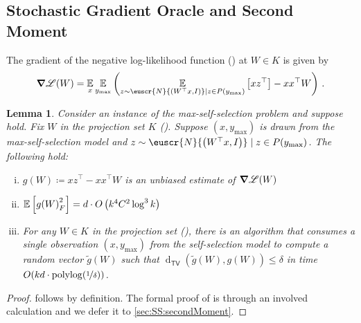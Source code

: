 \documentclass[11pt,letterpaper]{article}
\theoremstyle{plain}
\newtheorem{lemma}[theorem]{Lemma}
\theoremstyle{definition}
\theoremstyle{remark}
\newcommand{\inparen}[1]{\ensuremath{\left(#1\right)}}
\newcommand{\insquare}[1]{\ensuremath{\left[#1\right]}}
\let\norm\relax
\newcommand{\norm}[1]{\ensuremath{\left\lVert #1 \right\rVert}}
\newcommand{\E}{\operatornamewithlimits{\mathbb{E}}}
\newcommand{\Ex}{\E}
\newcommand{\tv}[2]{\operatorname{d}_{\mathsf{TV}}{\inparen{#1,#2}}}
\newcommand{\nfrac}[2]{\nicefrac{#1}{#2}}
\newcommand{\polylog}{\mathrm{polylog}}
\renewcommand{\tilde}{\widetilde}
\newcommand{\customcal}[1]{\euscr{#1}}
\newcommand{\cL}{\customcal{L}}
\newcommand{\cN}{\customcal{N}}
\newcommand{\negLL}{\ensuremath{\mathscr{L}}}
\newcommand{\normal}[2]{\cN{\inparen{#1,#2}}}
\newcommand{\ymax}{y_{\max}}
\renewcommand{\cL}{\negLL}
\begin{document}
{{\subsection{Stochastic Gradient Oracle and Second Moment}
    The gradient of the negative log-likelihood function () at $W\in K$ is given by
    \begin{align*}
        \grad \cL(W)
            = \Ex_x \Ex_{\ymax}
                \inparen{
                    \Ex_{z\sim \normal{W^\top x}{I} \mid z\in P(\ymax)}\insquare{xz^\top }
                    - 
                    xx^\top W
                }
            \,.
    \end{align*}
    
    \begin{lemma}\label{lem:SS:gradientOracle}
        Consider an instance of the max-self-selection problem
        and suppose  hold.
        Fix $W$ in the projection set $K$ ().
        Suppose $(x, \ymax)$ is drawn from the max-self-selection model
        and $z\sim \normal{W^\top x}{I}\mid z\in P(\ymax)$.
        The following hold:
        \begin{enumerate}[(i)]
            \item $g(W)\coloneqq xz^\top - xx^\top W$ is an unbiased estimate of $\grad \negLL(W)$ \label{part:SS:gradientOracle:unbiased}
            \item $\E\insquare{\norm{g(W)}_F^2} = d\cdot O\inparen{k^4C^2 \log^3{k}}$ \label{part:SS:gradientOracle:secondMoment} 
            \item For any $W\in K$ in the projection set (),
            there is an algorithm that consumes a single observation $(x, \ymax)$ 
            from the self-selection model
            to compute a random vector $\tilde g(W)$ such that $\tv{\tilde g(W)}{g(W)}\leq \delta$
            in time $O(kd\cdot \polylog(\nfrac1{\delta}))$. \label{part:SS:gradientOracle:algorithm}
        \end{enumerate}
    \end{lemma}

    \begin{proof}
        \sloppy
         follows by definition.
        The formal proof of  is through an involved calculation
        and we defer it to \cref{sec:SS:secondMoment}.


\end{proof}}}
\end{document}
